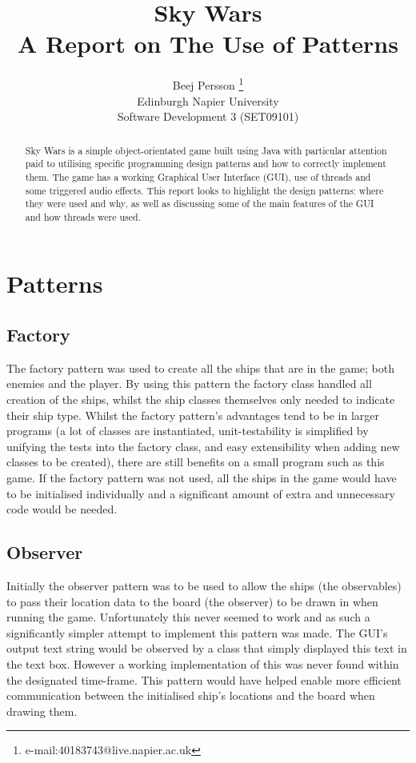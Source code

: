 \documentclass[conference,backref=page]{acmsiggraph}
\title{Sky Wars\\
	  A Report on The Use of Patterns}
\author{Beej Persson \thanks{e-mail:40183743@live.napier.ac.uk} \\
Edinburgh Napier University\\
Software Development 3 (SET09101)}
\begin{document}
\maketitle

\raggedbottom

\begin{abstract}

Sky Wars is a simple object-orientated game built using Java with particular attention paid to utilising specific programming design patterns and how to correctly implement them. The game has a working Graphical User Interface (GUI), use of threads and some triggered audio effects. This report looks to highlight the design patterns: where they were used and why, as well as discussing some of the main features of the GUI and how threads were used.

\end{abstract}



\keywordlist


\section{Patterns}


\subsection{Factory}
The factory pattern was used to create all the ships that are in the game; both enemies and the player. By using this pattern the factory class handled all creation of the ships, whilst the ship classes themselves only needed to indicate their ship type. Whilst the factory pattern's advantages tend to be in larger programs (a lot of classes are instantiated, unit-testability is simplified by unifying the tests into the factory class, and easy extensibility when adding new classes to be created), there are still benefits on a small program such as this game. If the factory pattern was not used, all the ships in the game would have to be initialised individually and a significant amount of extra and unnecessary code would be needed.

\subsection{Observer}
Initially the observer pattern was to be used to allow the ships (the observables) to pass their location data to the board (the observer) to be drawn in when running the game. Unfortunately this never seemed to work and as such a significantly simpler attempt to implement this pattern was made. The GUI's output text string would be observed by a class that simply displayed this text in the text box. However a working implementation of this was never found within the designated time-frame. This pattern would have helped enable more efficient communication between the initialised ship's locations and the board when drawing them.
\end{document}
